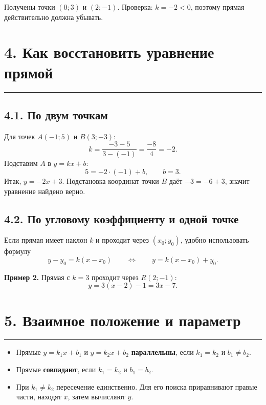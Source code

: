 \documentclass[a4paper,12pt]{article}
\newcommand{\sectionline}{\par\vspace{2pt}\textcolor{accent}{\rule{\linewidth}{0.8pt}}\vspace{5pt}}
\newcommand{\key}[1]{\textcolor{darkaccent}{\textbf{#1}}}
\begin{document}
Получены точки $(0;3)$ и $(2;-1)$. Проверка: $k=-2<0$, поэтому прямая
действительно должна убывать.

\begin{center}
\end{center}

\section*{4. Как восстановить уравнение прямой}
\sectionline

\subsection*{4.1. По двум точкам}

Для точек $A(-1;5)$ и $B(3;-3)$:
\[
  k=\frac{-3-5}{3-(-1)}=\frac{-8}{4}=-2.
\]
Подставим $A$ в $y=kx+b$:
\[
  5=-2\cdot(-1)+b,\qquad b=3.
\]
Итак, \key{$y=-2x+3$}. Подстановка координат точки $B$ даёт
$-3=-6+3$, значит уравнение найдено верно.

\subsection*{4.2. По угловому коэффициенту и одной точке}

Если прямая имеет наклон $k$ и проходит через $(x_0;y_0)$, удобно использовать
формулу
\[
  \boxed{y-y_0=k(x-x_0)}
  \qquad\Longleftrightarrow\qquad
  \boxed{y=k(x-x_0)+y_0}.
\]

\key{Пример 2.} Прямая с $k=3$ проходит через $R(2;-1)$:
\[
  y=3(x-2)-1=3x-7.
\]

\section*{5. Взаимное положение и параметр}
\sectionline

\begin{itemize}
  \item Прямые $y=k_1x+b_1$ и $y=k_2x+b_2$ \key{параллельны}, если
  $k_1=k_2$ и $b_1\ne b_2$.
  \item Прямые \key{совпадают}, если $k_1=k_2$ и $b_1=b_2$.
  \item При $k_1\ne k_2$ пересечение единственно. Для его поиска приравнивают
  правые части, находят $x$, затем вычисляют $y$.
\end{itemize}
\end{document}
